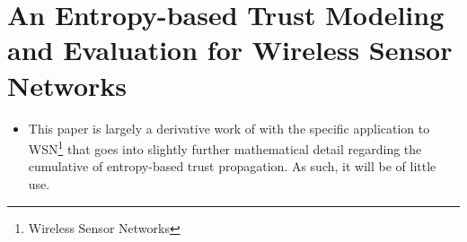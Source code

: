 \section{An Entropy-based Trust Modeling and Evaluation for Wireless Sensor Networks \citet*{Hongjun2008}}
\label{Honjun2008}
\begin{itemize}
  \item This paper is largely a derivative work of \cite{Liu2006} with the specific application to WSN\footnote{Wireless Sensor Networks} that goes into slightly further mathematical detail regarding the cumulative of entropy-based trust propagation. As such, it will be of little use.
\end{itemize}
